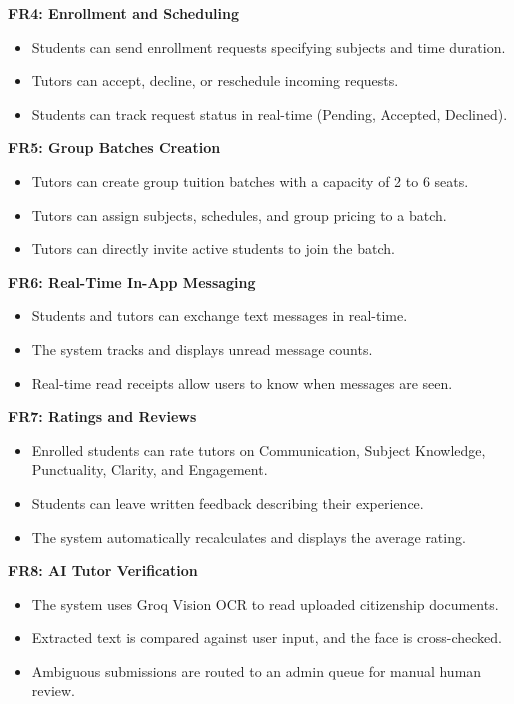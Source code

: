 \documentclass[12pt]{report}
\begin{document}
\smallskip
\noindent \textbf{FR4: Enrollment and Scheduling}
\begin{itemize}
\item Students can send enrollment requests specifying subjects and time duration.
\item Tutors can accept, decline, or reschedule incoming requests.
\item Students can track request status in real-time (Pending, Accepted, Declined).
\end{itemize}

\smallskip
\noindent \textbf{FR5: Group Batches Creation}
\begin{itemize}
\item Tutors can create group tuition batches with a capacity of 2 to 6 seats.
\item Tutors can assign subjects, schedules, and group pricing to a batch.
\item Tutors can directly invite active students to join the batch.
\end{itemize}

\smallskip
\noindent \textbf{FR6: Real-Time In-App Messaging}
\begin{itemize}
\item Students and tutors can exchange text messages in real-time.
\item The system tracks and displays unread message counts.
\item Real-time read receipts allow users to know when messages are seen.
\end{itemize}

\smallskip
\noindent \textbf{FR7: Ratings and Reviews}
\begin{itemize}
\item Enrolled students can rate tutors on Communication, Subject Knowledge, Punctuality, Clarity, and Engagement.
\item Students can leave written feedback describing their experience.
\item The system automatically recalculates and displays the average rating.
\end{itemize}

\smallskip
\noindent \textbf{FR8: AI Tutor Verification}
\begin{itemize}
\item The system uses Groq Vision OCR to read uploaded citizenship documents.
\item Extracted text is compared against user input, and the face is cross-checked.
\item Ambiguous submissions are routed to an admin queue for manual human review.
\end{itemize}
\end{document}
